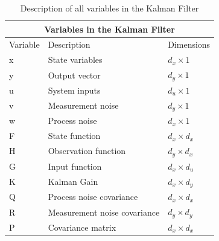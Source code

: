 \begin{center}
\begin{table}
\centering
\caption{Description of all variables in the Kalman Filter} \label{tab:sometab}
\begin{tabular}{ |p{2cm}||p{5cm}|p{2cm}| }
    \hline
    \multicolumn{3}{|c|}{Variables in the Kalman Filter } \\ 
    \hline
    Variable & Description & Dimensions \\
    \hline
    x & State variables  & $d_x \times 1$ \\
    y & Output vector  & $d_y \times 1$ \\
    u & System inputs  & $d_u \times 1$\\
    v & Measurement noise & $d_y \times 1$\\
    w & Process noise & $d_x \times 1$\\
    F & State function  & $d_x \times d_x $  \\ 
    H & Observation function & $d_y \times d_x$\\
    G & Input function & $d_x \times d_u$\\
    K & Kalman Gain  & $d_x \times d_y$\\
    Q & Process noise covariance  & $d_x \times d_x$ \\
    R & Measurement noise covariance &  $d_y \times d_y$\\
    P & Covariance matrix & $d_x \times d_x $  \\ 
    
    \hline
\end{tabular}

\end{table}
\end{center} 




